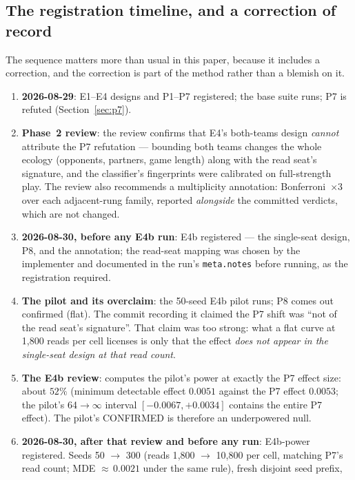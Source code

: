 \documentclass[11pt]{article}
\newcommand{\code}[1]{\texttt{#1}}
\begin{document}
\subsection{The registration timeline, and a correction of record}
\label{sec:timeline}

The sequence matters more than usual in this paper, because it includes a correction,
and the correction is part of the method rather than a blemish on it.

\begin{enumerate}
\item \textbf{2026-08-29}: E1--E4 designs and P1--P7 registered; the base suite runs;
  P7 is refuted (Section~\ref{sec:p7}).
\item \textbf{Phase~2 review}: the review confirms that E4's both-teams design
  \emph{cannot} attribute the P7 refutation --- bounding both teams changes the whole
  ecology (opponents, partners, game length) along with the read seat's signature, and
  the classifier's fingerprints were calibrated on full-strength play. The review also
  recommends a multiplicity annotation: Bonferroni~$\times 3$ over each adjacent-rung
  family, reported \emph{alongside} the committed verdicts, which are not changed.
\item \textbf{2026-08-30, before any E4b run}: E4b registered --- the single-seat
  design, P8, and the annotation; the read-seat mapping was chosen by the implementer
  and documented in the run's \code{meta.notes} before running, as the registration
  required.
\item \textbf{The pilot and its overclaim}: the 50-seed E4b pilot runs; P8 comes out
  confirmed (flat). The commit recording it claimed the P7 shift was ``not of the read
  seat's signature''. That claim was too strong: what a flat curve at 1{,}800 reads per
  cell licenses is only that the effect \emph{does not appear in the single-seat design
  at that read count}.
\item \textbf{The E4b review}: computes the pilot's power at exactly the P7 effect
  size: about $52\%$ (minimum detectable effect $0.0051$ against the P7 effect
  $0.0053$; the pilot's 64${\to}\infty$ interval $[-0.0067, +0.0034]$ contains the
  entire P7 effect). The pilot's CONFIRMED is therefore an underpowered null.
\item \textbf{2026-08-30, after that review and before any run}: E4b-power registered.
  Seeds 50 ${\to}$ 300 (reads 1{,}800 ${\to}$ 10{,}800 per cell, matching P7's read
  count; MDE ${\approx}\,0.0021$ under the same rule), fresh disjoint seed prefix,

\end{enumerate}
\end{document}
